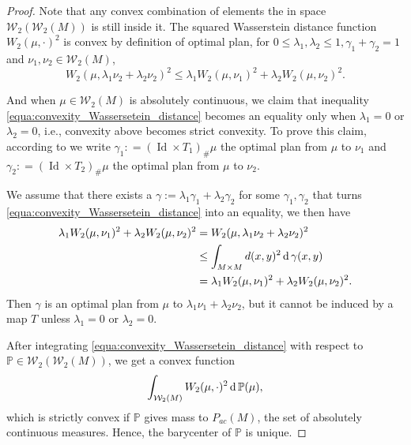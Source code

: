 \begin{proof}
	Note that any convex combination of elements the in space $\mathcal{W}_2(\mathcal{W}_2(M))$ is still inside it.
	The squared Wasserstein distance function $W_2(\mu, \cdot)^2$ is convex by definition of optimal plan,
	for $0 \leq \lambda_1, \lambda_2 \leq 1, \gamma_1 + \gamma_2 =1 $ and $ \nu_1,\nu_2 \in \mathcal{W}_2(M)$,
	\begin{equation}
		\label{equa:convexity_Wassersetein_distance}
		W_2(\mu, \lambda_1 \nu_2 + \lambda_2 \nu_2)^2 \leq
		\lambda_1 W_2(\mu, \nu_1)^2 + \lambda_2 W_2(\mu, \nu_2)^2.
	\end{equation}

	And when $\mu \in \mathcal{W}_2(M)$ is absolutely continuous,
	we claim that inequality \cref{equa:convexity_Wassersetein_distance} becomes an equality only when
	$\lambda_1=0$ or $\lambda_2=0$,
	i.e.,
	convexity above becomes strict convexity.
	To prove this claim,
	according to  we write
	$\gamma_1 : = (\operatorname{Id}  \times T_1)_{\#}\mu$ the optimal plan from $\mu$ to $\nu_1$ and
	$\gamma_2 : = (\operatorname{Id}  \times T_2)_{\#}\mu$ the optimal plan from $\mu$ to $\nu_2$.

	We assume that there exists a $\gamma := \lambda_1 \gamma_1 + \lambda_2 \gamma_2$
	for some $\gamma_1, \gamma_2$ that turns
	\cref{equa:convexity_Wassersetein_distance} into an equality,
	we then have
	\begin{align*}
		\lambda_1 W_2(\mu, \nu_1)^2 + \lambda_2 W_2(\mu, \nu_2)^2
		 & = W_2(\mu, \lambda_1 \nu_2 + \lambda_2 \nu_2)^2             \\
		 & \leq \int_{M \times M} d(x,y)^2 \operatorname{d} \gamma(x,y)           \\
		 & =	\lambda_1 W_2(\mu, \nu_1)^2 + \lambda_2 W_2(\mu, \nu_2)^2.
	\end{align*}
	Then $\gamma$ is an optimal plan from $ \mu$ to $\lambda_1 \nu_1 + \lambda_2 \nu_2$,
	but it cannot be induced by a map $T$ unless $\lambda_1 =0$ or $\lambda_2 =0$.

	After integrating \cref{equa:convexity_Wassersetein_distance} with respect to $\mathbb{P} \in \mathcal{W}_2(\mathcal{W}_2(M))$,
	we get a convex function
	\[\int_{\mathcal{W}_2(M)} W_2(\mu, \cdot)^2 \operatorname{d} \mathbb{P}(\mu),\]
	which is strictly convex if $\mathbb{P}$ gives mass to $P_{ac}(M)$, the set of absolutely continuous measures.
	Hence, the barycenter of $\mathbb{P}$ is unique.
\end{proof}

